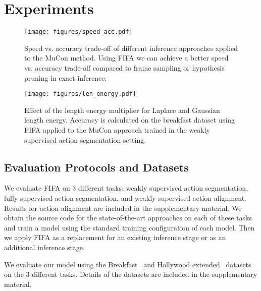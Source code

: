 \section{Experiments}




\begin{figure}[tb]
   \begin{minipage}{0.48\textwidth}
      \centering
         \texttt{[image: figures/speed\_acc.pdf]}
      \caption{
         Speed vs. accuracy trade-off of different inference approaches applied to the MuCon method.
         Using FIFA we can achieve a better speed vs. accuracy trade-off compared to frame sampling or hypothesis pruning in exact inference.}
      \label{fig:speed_acc}
   \end{minipage}\hfill
   \begin{minipage}{0.48\textwidth}
      \centering
         \texttt{[image: figures/len\_energy.pdf]}
      \caption{Effect of the length energy multiplier for Laplace and Gaussian length energy. Accuracy is calculated on the breakfast dataset using FIFA applied to the MuCon approach trained in the weakly supervised action segmentation setting.}
      \label{fig:len_energy}
   \end{minipage}
\end{figure}


\subsection{Evaluation Protocols and Datasets}
We evaluate FIFA on 3 different tasks: weakly supervised action segmentation, fully supervised action segmentation, and weakly supervised action alignment. Results for action alignment are included in the supplementary material.
We obtain the source code for the state-of-the-art approaches on each of these tasks and train a model using the standard training configuration of each model.
Then we apply FIFA as a replacement for an existing inference stage or as an additional inference stage.

We evaluate our model using the Breakfast~\cite{breakfast} and Hollywood extended~\cite{hollywoodextended} datasets on the 3 different tasks. Details of the datasets are included in the supplementary material.

\begin{comment}
Breakfast is the most popular dataset currently used for action segmentation.
It contains more than 1.7k videos of different cooking activities. The dataset consists of 48 different fine-grained actions. In our experiments, we follow the 4 train/test splits provided with the dataset and report the average.
The main performance metrics used for weakly supervised action segmentation and alignment are the same as the previous approaches.
The input features are also kept the same depending on the approach we use FIFA with.
\end{comment}



